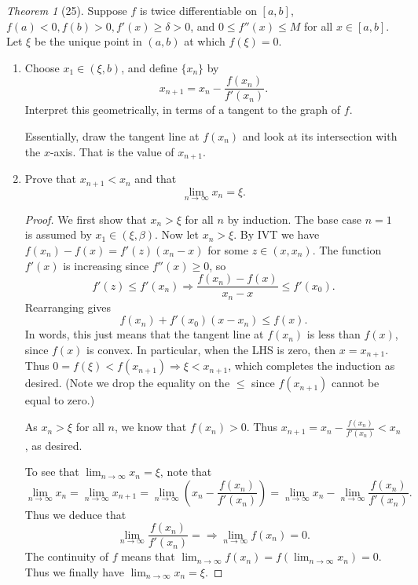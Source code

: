 \documentclass[12pt]{article}
\theoremstyle{remark}
\theoremstyle{named}
\newtheorem*{theorem}{Theorem}
\renewcommand{\b}{\beta}
\begin{document}
\begin{theorem}[25]
    Suppose \(f\) is twice differentiable on \([a, b]\), \(f(a) < 0, f(b) > 0, f'(x) \ge \delta > 0\), and \(0 \le f''(x) \le M\) for all \(x \in [a, b]\). Let \(\xi\) be the unique point in \((a, b)\) at which \(f(\xi) = 0\).
\end{theorem}

\begin{enumerate}
    \item Choose \(x_1 \in (\xi, b)\), and define \(\{x_n\}\) by
    \[x_{n + 1} = x_n - \frac{f(x_n)}{f'(x_n)}.\]
    Interpret this geometrically, in terms of a tangent to the graph of \(f\).
    \newline

    Essentially, draw the tangent line at \(f(x_n)\) and look at its intersection with the \(x\)-axis. That is the value of \(x_{n + 1}\).

    \item Prove that \(x_{n + 1} < x_n\) and that \[\lim_{n \to \infty} x_n = \xi.\]
    
    \begin{proof}
        We first show that \(x_n > \xi\) for all \(n\) by induction. The base case \(n = 1\) is assumed by \(x_1 \in (\xi, \b)\). Now let \(x_n > \xi\). By IVT we have \(f(x_n) - f(x) = f'(z)(x_n - x)\) for some \(z \in (x, x_n)\). The function \(f'(x)\) is increasing since \(f''(x) \ge 0\), so \[f'(z) \le f'(x_n) \Rightarrow \frac{f(x_n) - f(x)}{x_n - x} \le f'(x_0).\] Rearranging gives 
        \[f(x_n) + f'(x_0)(x - x_n) \le f(x).\]
        In words, this just means that the tangent line at \(f(x_n)\) is less than \(f(x)\), since \(f(x)\) is convex. In particular, when the LHS is zero, then \(x = x_{n + 1}\). Thus \(0 = f(\xi) < f(x_{n + 1}) \Rightarrow \xi < x_{n + 1}\), which completes the induction as desired. (Note we drop the equality on the \(\le\) since \(f(x_{n + 1})\) cannot be equal to zero.)

        As \(x_n > \xi\) for all \(n\), we know that \(f(x_n) > 0\). Thus \(x_{n + 1} = x_n - \frac{f(x_n)}{f'(x_n)} < x_n\), as desired.

        To see that \(\lim_{n \to \infty}x_n = \xi\), note that 
        \[\lim_{n \to \infty} x_n = \lim_{n \to \infty} x_{n + 1} = \lim_{n \to \infty} \left(x_n - \frac{f(x_n)}{f'(x_n)}\right) = \lim_{n \to \infty}x_n - \lim_{n \to \infty}\frac{f(x_n)}{f'(x_n)}.\]
        Thus we deduce that \[\lim_{n \to \infty} \frac{f(x_n)}{f'(x_n)} = \Rightarrow \lim_{n \to \infty} f(x_n) = 0.\]
        The continuity of \(f\) means that \(\lim_{n \to \infty} f(x_n) = f(\lim_{n \to \infty} x_n) = 0\). Thus we finally have \(\lim_{n \to \infty} x_n = \xi\).
    \end{proof}


\end{enumerate}
\end{document}
